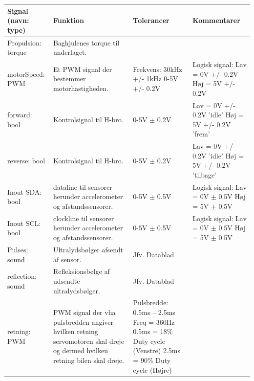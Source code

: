 \begin{table}[h]
	\centering
	\begin{tabularx}{\textwidth}{|l|Z|Z|Z|} \hline
	\textbf{Signal (navn: type)} & \textbf{Funktion} & \textbf{Tolerancer} & \textbf{Kommentarer} \\ \hline

Propulsion: torque
	& Baghjulenes torque til underlaget.
	& ~
	& ~
	\\ \hline

motorSpeed: PWM
	& Et PWM signal der bestemmer motorhastigheden. 
	& Frekvens: 30kHz +/- 1kHz 0-5V +/- 0.2V
 	& Logisk signal: \newline
		Lav = 0V +/- 0.2V \newline
		Høj = 5V +/- 0.2V
	\\ \hline

forward: bool
	& Kontrolsignal til H-bro.
	& 0-5V $\pm$ 0.2V
	& Lav = 0V +/- 0.2V  ’idle’ \newline
		Høj =  5V +/- 0.2V  ’frem’
	\\ \hline
	
reverse: bool
	& Kontrolsignal til H-bro.
	& 0-5V $\pm$ 0.2V
	& Lav = 0V +/- 0.2V ’idle’ \newline
		Høj =  5V +/- 0.2V  ’tilbage’
	\\ \hline
	
Inout SDA: bool
	& \IIC dataline til sensorer herunder accelerometer og afstandssensorer. 
	& 0-5V $\pm$ 0.5V
 	& Logisk signal: \newline
		Lav = 0V $\pm$ 0.5V \newline
		Høj = 5V $\pm$ 0.5V
	\\ \hline

Inout SCL: bool
	& \IIC clockline  til sensorer herunder accelerometer og afstandssensorer. 
	& 0-5V $\pm$ 0.5V
 	& Logisk signal: \newline
		Lav = 0V $\pm$ 0.5V \newline
		Høj = 5V $\pm$ 0.5V
	\\ \hline

Pulses: sound
	& Ultralydsbølger afsendt af sensor. 
	& Jfv. Datablad \cite{lib:maxsonar} 
 	& ~
	\\ \hline
	
reflection: sound
	& Refleksionsbølge af udsendte ultralydsbølger. 
	& Jfv. Datablad \cite{lib:maxsonar}
 	& ~
	\\ \hline
	
retning: PWM 
	& PWM signal der vha pulsbredden angiver hvilken retning servomotoren skal dreje og dermed hvilken retning bilen skal dreje. 
	& Pulsbredde: 0.5ms – 2.5ms \newline
		Freq = 360Hz \newline
		0.5ms = 18\% Duty cycle (Venstre)\newline
		2.5ms = 90\% Duty cycle (Højre)
	& ~
	\\ \hline


\end{tabularx}
\end{table}
